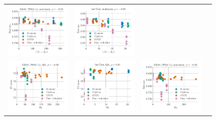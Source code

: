 \begin{figure}
\begin{tabular}{@{\hskip -0.0in}c@{\hskip -0.0in}c@{\hskip -0.0in}c@{\hskip -0.0in}c@{\hskip -0.0in}}
		\includegraphics[width=.245\linewidth]{figures/glove400k_sentiment_sst_test-acc_vs_gram-large-dim-delta1-2-trans_linx_stoc.pdf} &
		\includegraphics[width=.245\linewidth]{figures/fasttext1m_sentiment_sst_test-acc_vs_gram-large-dim-delta1-2-trans_linx_stoc.pdf} \\
		\includegraphics[width=.245\linewidth]{figures/glove400k_qa_best-f1_vs_gram-large-dim-delta2-2_linx_stoc.pdf} &
		\includegraphics[width=.245\linewidth]{figures/fasttext1m_qa_best-f1_vs_gram-large-dim-delta2-2_linx_stoc.pdf} &
		\includegraphics[width=.245\linewidth]{figures/glove400k_sentiment_sst_test-acc_vs_gram-large-dim-delta2-2_linx_stoc.pdf} &

\end{tabular}
\end{figure}

